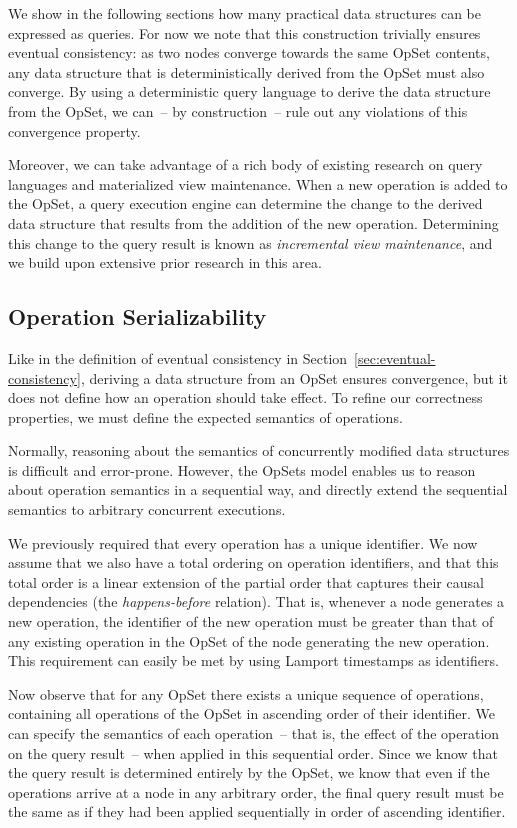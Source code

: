 We show in the following sections how many practical data structures can be expressed as queries.
For now we note that this construction trivially ensures eventual consistency: as two nodes converge towards the same OpSet contents, any data structure that is deterministically derived from the OpSet must also converge.
By using a deterministic query language to derive the data structure from the OpSet, we can~-- by construction~-- rule out any violations of this convergence property.

Moreover, we can take advantage of a rich body of existing research on query languages and materialized view maintenance.
When a new operation is added to the OpSet, a query execution engine can determine the change to the derived data structure that results from the addition of the new operation.
Determining this change to the query result is known as \emph{incremental view maintenance}, and we build upon extensive prior research in this area.

\subsection{Operation Serializability}\label{sec:op-serial}

Like in the definition of eventual consistency in Section~\ref{sec:eventual-consistency}, deriving a data structure from an OpSet ensures convergence, but it does not define how an operation should take effect.
To refine our correctness properties, we must define the expected semantics of operations.

Normally, reasoning about the semantics of concurrently modified data structures is difficult and error-prone.
However, the OpSets model enables us to reason about operation semantics in a sequential way, and directly extend the sequential semantics to arbitrary concurrent executions.

We previously required that every operation has a unique identifier.
We now assume that we also have a total ordering on operation identifiers, and that this total order is a linear extension of the partial order that captures their causal dependencies (the \emph{happens-before} relation).
That is, whenever a node generates a new operation, the identifier of the new operation must be greater than that of any existing operation in the OpSet of the node generating the new operation.
This requirement can easily be met by using Lamport timestamps \cite{Lamport:1978jq} as identifiers.

Now observe that for any OpSet there exists a unique sequence of operations, containing all operations of the OpSet in ascending order of their identifier.
We can specify the semantics of each operation~-- that is, the effect of the operation on the query result~-- when applied in this sequential order.
Since we know that the query result is determined entirely by the OpSet, we know that even if the operations arrive at a node in any arbitrary order, the final query result must be the same as if they had been applied sequentially in order of ascending identifier.

